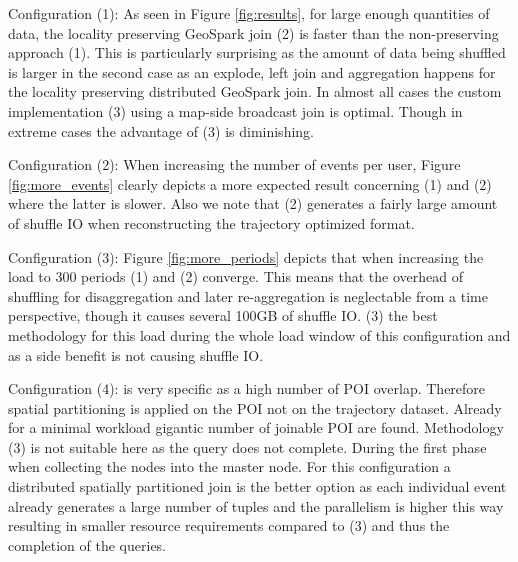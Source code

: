 \documentclass[conference]{IEEEtran}
\begin{document}
Configuration (1): As seen in Figure \ref{fig:results}, for large enough quantities of data, the locality preserving GeoSpark join (2) is faster than the non-preserving approach (1).
This is particularly surprising as the amount of data being shuffled is larger in the second case as an explode, left join and aggregation happens for the locality preserving distributed GeoSpark join.
In almost all cases the custom implementation (3) using a map-side broadcast join is optimal.
Though in extreme cases the advantage of (3) is diminishing.

Configuration (2): When increasing the number of events per user, Figure \ref{fig:more_events} clearly depicts a more expected result concerning (1) and (2) where the latter is slower.
Also we note that (2) generates a fairly large amount of shuffle IO when reconstructing the trajectory optimized format.

Configuration (3): Figure \ref{fig:more_periods} depicts that when increasing the load to 300 periods (1) and (2) converge.
This means that the overhead of shuffling for disaggregation and later re-aggregation is neglectable from a time perspective, though it causes several 100GB of shuffle IO.
(3) the best methodology for this load during the whole load window of this configuration and as a side benefit is not causing shuffle IO.

Configuration (4): is very specific as a high number of POI overlap.
Therefore spatial partitioning is applied on the POI not on the trajectory dataset.
Already for a minimal workload gigantic number of joinable POI are found. Methodology (3) is not suitable here as the query does not complete. During the first phase when collecting the nodes into the master node.
For this configuration a distributed spatially partitioned join is the better option as each individual event already generates a large number of tuples and the parallelism is higher this way resulting in smaller resource requirements compared to (3) and thus the completion of the queries.
\end{document}
